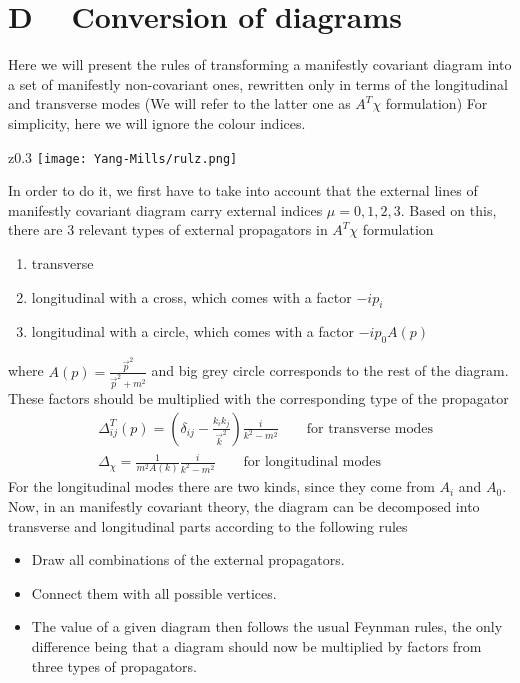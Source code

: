 \documentclass{article}
\begin{document}
\section*{\textbf{D}$\quad$ Conversion of diagrams}
Here we will present the rules of transforming a manifestly covariant diagram into a set of manifestly non-covariant ones, rewritten only in terms of the longitudinal and transverse modes (We will refer to the latter one as $A^T\chi$ formulation) For simplicity, here we will ignore the colour indices. 
\newline
\begin{wrapfigure}[13]{z}{0.3\textwidth} 
    \centering
    \texttt{[image: Yang-Mills/rulz.png]}
\end{wrapfigure}
In order to do it, we first have to take into account that the external lines of manifestly covariant diagram carry external indices $\mu=0,1,2,3$.
 Based on this, there are 3 relevant types of external propagators in $A^T\chi$ formulation
\begin{enumerate}
    \item transverse 
    \item longitudinal with a cross, which comes with a factor $-ip_i$
    \item longitudinal with a circle, which comes with a factor $-ip_0A(p)$
\end{enumerate}
where $A(p)=\frac{\vec{p}^2}{\vec{p}^2+m^2}$ and big grey circle corresponds to the rest of the diagram. 
These factors should be multiplied with the corresponding type of the propagator
\begin{equation}
    \begin{split}
        &\Delta_{ij}^T(p)=(\delta_{ij}-\frac{k_ik_j}{\Vec{k}^2})\frac{i}{k^2-m^2} \quad\quad\text{for transverse modes}\\
        &\Delta_{\chi}=\frac{1}{m^2A(k)}\frac{i}{k^2-m^2}\quad\quad\text{for longitudinal modes}
    \end{split}
\end{equation}
For the longitudinal modes there are two kinds, since they come from $A_i$ and $A_0$.
Now, in an manifestly covariant theory, the diagram can be decomposed into transverse and longitudinal parts according to the following rules
\begin{itemize}
    \item Draw all combinations of the external propagators.
    \item Connect them with all possible vertices. 
    \item The value of a given diagram then follows the usual Feynman rules, the only difference being that a diagram should now be multiplied by factors from three types of propagators. 
\end{itemize}
\end{document}
